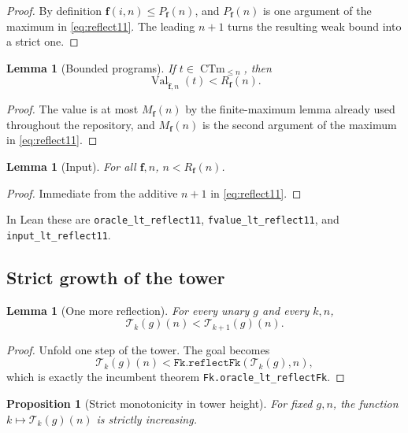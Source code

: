 \documentclass[11pt]{article}
\newtheorem{lemma}[theorem]{Lemma}
\newtheorem{proposition}[theorem]{Proposition}
\theoremstyle{definition}
\theoremstyle{remark}
\newcommand{\Rfam}{\ensuremath{R_{\mathbf f}}}
\newcommand{\code}[1]{\texttt{#1}}
\begin{document}
\begin{proof}
By definition $\mathbf f(i,n)\le P_{\mathbf f}(n)$, and
$P_{\mathbf f}(n)$ is one argument of the maximum in
\cref{eq:reflect11}. The leading $n+1$ turns the resulting weak bound into a
strict one.
\end{proof}

\begin{lemma}[Bounded programs]
\label{lem:programR}
If $t\in\operatorname{CTm}_{\le n}$, then
\[
  \operatorname{Val}_{\widehat{\mathbf f},n}(t)<\Rfam(n).
\]
\end{lemma}

\begin{proof}
The value is at most $M_{\mathbf f}(n)$ by the finite-maximum lemma already
used throughout the repository, and $M_{\mathbf f}(n)$ is the second argument
of the maximum in \cref{eq:reflect11}.
\end{proof}

\begin{lemma}[Input]
\label{lem:inputR}
For all $\mathbf f,n$, $n<\Rfam(n)$.
\end{lemma}

\begin{proof}
Immediate from the additive $n+1$ in \cref{eq:reflect11}.
\end{proof}

In Lean these are \code{oracle\_lt\_reflect11},
\code{fvalue\_lt\_reflect11}, and \code{input\_lt\_reflect11}.

\subsection{Strict growth of the tower}

\begin{lemma}[One more reflection]
\label{lem:towerstep}
For every unary $g$ and every $k,n$,
\[
  \mathcal T_k(g)(n)<\mathcal T_{k+1}(g)(n).
\]
\end{lemma}

\begin{proof}
Unfold one step of the tower. The goal becomes
\[
  \mathcal T_k(g)(n)
  < \code{Fk.reflectFk}(\mathcal T_k(g),n),
\]
which is exactly the incumbent theorem
\code{Fk.oracle\_lt\_reflectFk}.
\end{proof}

\begin{proposition}[Strict monotonicity in tower height]
\label{prop:towermono}
For fixed $g,n$, the function $k\mapsto\mathcal T_k(g)(n)$ is strictly
increasing.
\end{proposition}
\end{document}
